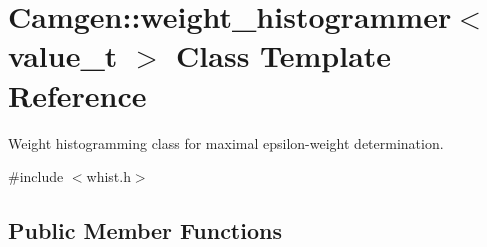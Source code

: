 \hypertarget{a00596}{}\section{Camgen\+:\+:weight\+\_\+histogrammer$<$ value\+\_\+t $>$ Class Template Reference}
\label{a00596}


Weight histogramming class for maximal epsilon-\/weight determination.  




{\ttfamily \#include $<$whist.\+h$>$}

\subsection*{Public Member Functions}
